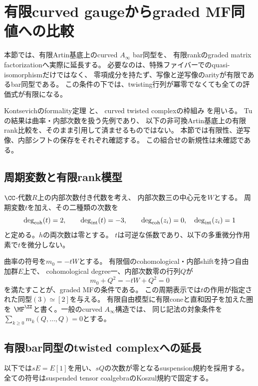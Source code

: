 \section{有限curved gaugeからgraded MF同値への比較}
\label{cg:sec:comparison}

本節では、有限Artin基底上のcurved $A_\infty$ bar同型を、
有限rankのgraded matrix factorizationへ実際に延長する。
必要なのは、特殊ファイバーでのquasi-isomorphismだけではなく、
零項成分を持たず、写像と逆写像のarityが有限であるbar同型である。
この条件の下では、twisting行列が冪零でなくても全ての評価式が有限になる。

Kontsevichのformality定理
\cite[Sections~5--6, 特にSection~6.4]{PKontsevich}と、
curved twisted complexの枠組み
\cite[Theorem~2.12]{CT}\cite[Sections~2.2, 6.1]{CGTu}
を用いる。
Tuの結果は曲率・内部次数を扱う先例であり、
以下の非可換Artin基底上の有限rank比較を、そのまま引用して済ませるものではない。
本節では有限性、逆写像、内部シフトの保存をそれぞれ確認する。
この組合せの新規性は未確認である。

\subsection{周期変数と有限rank模型}

$\CC$-代数$R$上の内部次数付き代数を考え、
内部次数三の中心元を$W$とする。
周期変数$t$を加え、その二種類の次数を
\begin{equation}\label{cg:eq:bidegree}
 \deg_{\rm coh}(t)=2,\qquad \deg_{\rm int}(t)=-3,\qquad
 \deg_{\rm coh}(z_i)=0,\quad \deg_{\rm int}(z_i)=1
\end{equation}
と定める。$h$の両次数は零とする。
$t$は可逆な係数であり、以下の多重微分作用素で$t$を微分しない。

曲率の符号を$m_0=-tW$とする。
有限個のcohomological・内部shiftを持つ自由加群$E$上で、
cohomological degree一、内部次数零の行列$Q$が
\[
 m_0+Q^2=-tW+Q^2=0
\]
を満たすことが、graded MFの条件である。
この周期表示では$t$の作用が指定された同型$(3)\simeq[2]$を与える。
有限自由模型に有限coneと直和因子を加えた圏を
$\MF^{\ZZ}$と書く。一般のcurved $A_\infty$構造では、
同じ記法の対象条件を$\sum_{k\ge0}m_k(Q,\ldots,Q)=0$とする。

\subsection{有限bar同型のtwisted complexへの延長}

以下では$sE=E[1]$を用い、$sQ$の次数が零となるsuspension規約を採用する。
全ての符号はsuspended tensor coalgebraのKoszul規約で固定する。

